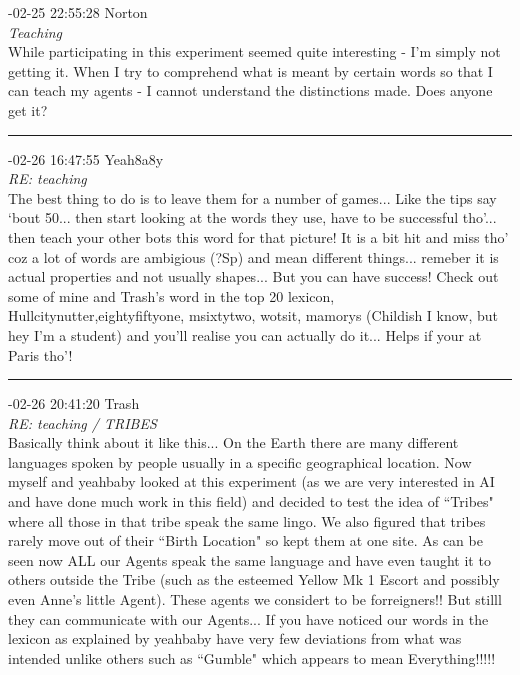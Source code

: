 \begin{mail}

{-02-25 22:55:28 Norton}\\
{\itshape Teaching}\\
While participating in this experiment seemed quite interesting - I'm simply not getting it. When I try to comprehend what is meant by certain words so that I can teach my agents - I cannot understand the distinctions made.  Does anyone get it? \\

\rule{0.8\textwidth}{.4pt}

{-02-26 16:47:55 Yeah8a8y}\\
{\itshape RE: teaching}\\
The best thing to do is to leave them for a number of games... Like the tips say `bout 50... then start looking at the words they use, have to be successful tho'... then teach your other bots this word for that picture! It is a bit hit and miss tho' coz a lot of words are ambigious (?Sp) and mean different things... remeber it is actual properties and not usually shapes... But you can have success! Check out some of mine and Trash's word in the top 20 lexicon, Hullcitynutter,eightyfiftyone, msixtytwo, wotsit, mamorys (Childish I know, but hey I'm a student) and you'll realise you can actually do it... Helps if your at Paris tho'!\\

\rule{0.8\textwidth}{.4pt}

{-02-26 20:41:20 Trash}\\
{\itshape RE: teaching / TRIBES}	\\
Basically think about it like this... On the Earth there are many different languages spoken by people usually in a specific geographical location. Now myself and yeahbaby looked at this experiment (as we are very interested in AI and have done much work in this field) and decided to test the idea of ``Tribes" where all those in that tribe speak the same lingo. We also figured that tribes rarely move out of their ``Birth Location" so kept them at one site. As can be seen now ALL our Agents speak the same language and have even taught it to others outside the Tribe (such as the esteemed Yellow Mk 1 Escort  and possibly even Anne's little Agent). 
These agents we considert to be forreigners!! But stilll they can communicate with our Agents... If you have noticed our words in the lexicon as explained by yeahbaby have  very few deviations from what was intended unlike others such as ``Gumble" which appears to mean Everything!!!!!


\end{mail}
